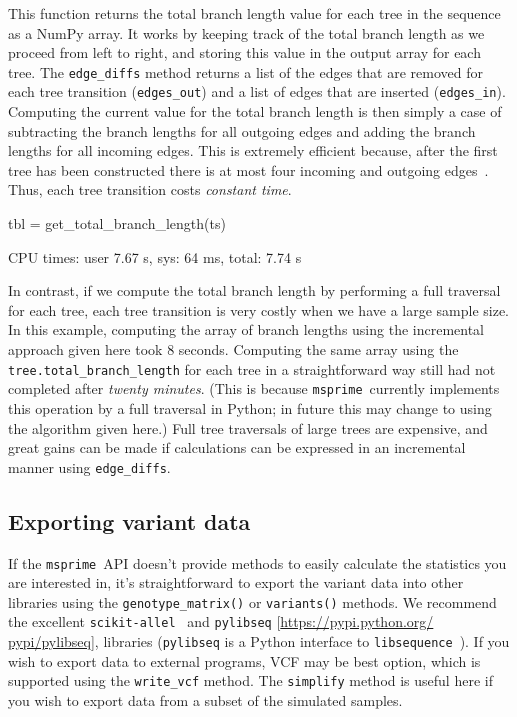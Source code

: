 \documentclass[graybox]{svmult}
\newcommand{\msprime}[0]{\texttt{msprime}}
\begin{document}
    This function returns the total branch length value for each tree in the
sequence as a NumPy array. It works by keeping track of the total branch
length as we proceed from left to right, and storing this value in the
output array for each tree. The \texttt{edge\_diffs} method returns a
list of the edges that are removed for each tree transition
(\texttt{edges\_out}) and a list of edges that are inserted
(\texttt{edges\_in}). Computing the current value for the total branch
length is then simply a case of subtracting the branch lengths for all
outgoing edges and adding the branch lengths for all incoming edges.
This is extremely efficient because, after the first tree has been
constructed there is at most four incoming and outgoing edges~\citep{kelleher2016efficient}. Thus,
each tree transition costs \emph{constant time}.

\begin{pythoncode}
tbl = get_total_branch_length(ts)

CPU times: user 7.67 s, sys: 64 ms, total: 7.74 s
\end{pythoncode}

In contrast, if we compute the total branch length by performing a
full traversal for each tree, each tree transition is very costly
when we have a large sample size. In this example, computing the array of branch lengths
using the incremental approach given here took 8 seconds. Computing the
same array using the \texttt{tree.total\_branch\_length} for each tree
in a straightforward way still had not completed after \emph{twenty
minutes}. (This is because \msprime\ currently implements this operation
by a full traversal in Python; in future this may change to using the
algorithm given here.) Full tree traversals of large trees are
expensive, and great gains can be made if calculations can be expressed
in an incremental manner using \texttt{edge\_diffs}.


\subsection{Exporting variant data}\label{exporting-variant-data}

If the \msprime\ API doesn't provide methods to easily calculate the
statistics you are interested in, it's straightforward to export the
variant data into other libraries using the \texttt{genotype\_matrix()}
or \texttt{variants()} methods. We recommend the excellent
\texttt{scikit-allel}~\citep{miles2017scikit} and
\texttt{pylibseq} [\url{https://pypi.python.org/} \url{pypi/pylibseq}],
libraries (\texttt{pylibseq} is a Python interface to
\texttt{libsequence}~\citep{thornton2003libsequence}). If you wish to export data to
external programs, VCF may be best option, which is supported using the
\texttt{write\_vcf} method. The \texttt{simplify} method is useful here
if you wish to export data from a subset of the simulated samples.
\end{document}

